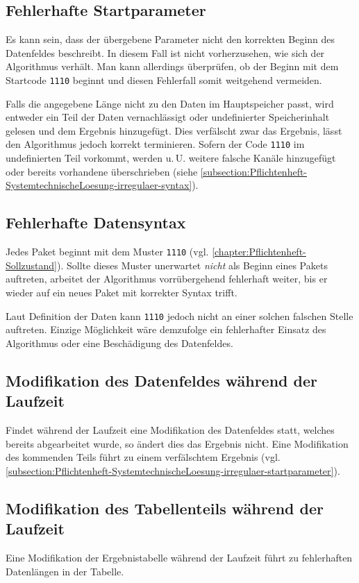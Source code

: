 \subsection{Fehlerhafte Startparameter}
\label{subsection:Pflichtenheft-SystemtechnischeLoesung-irregulaer-startparameter}

Es kann sein, dass der übergebene Parameter nicht den korrekten Beginn des Datenfeldes beschreibt. In diesem Fall ist nicht vorherzusehen, wie sich der Algorithmus verhält. Man kann allerdings überprüfen, ob der Beginn mit dem Startcode \texttt{1110} beginnt und diesen Fehlerfall somit weitgehend vermeiden.

Falls die angegebene Länge nicht zu den Daten im Hauptspeicher passt, wird entweder ein Teil der Daten vernachlässigt oder undefinierter Speicherinhalt gelesen und dem Ergebnis hinzugefügt. Dies verfälscht zwar das Ergebnis, lässt den Algorithmus jedoch korrekt terminieren. Sofern der Code \texttt{1110} im undefinierten Teil vorkommt, werden u.\,U. weitere falsche Kanäle hinzugefügt oder bereits vorhandene überschrieben (siehe \autoref{subsection:Pflichtenheft-SystemtechnischeLoesung-irregulaer-syntax}).

\subsection{Fehlerhafte Datensyntax}
\label{subsection:Pflichtenheft-SystemtechnischeLoesung-irregulaer-syntax}

Jedes Paket beginnt mit dem Muster \texttt{1110} (vgl. \autoref{chapter:Pflichtenheft-Sollzustand}). Sollte dieses Muster unerwartet \emph{nicht} als Beginn eines Pakets auftreten, arbeitet der Algorithmus vorrübergehend fehlerhaft weiter, bis er wieder auf ein neues Paket mit korrekter Syntax trifft.

Laut Definition der Daten kann \texttt{1110} jedoch nicht an einer solchen falschen Stelle auftreten. Einzige Möglichkeit wäre demzufolge ein fehlerhafter Einsatz des Algorithmus oder eine Beschädigung des Datenfeldes.

\subsection{Modifikation des Datenfeldes während der Laufzeit}
\label{subsection:Pflichtenheft-SystemtechnischeLoesung-irregulaer-moddatenfeld}

Findet während der Laufzeit eine Modifikation des Datenfeldes statt, welches bereits abgearbeitet wurde, so ändert dies das Ergebnis nicht. Eine Modifikation des kommenden Teils führt zu einem verfälschtem Ergebnis (vgl. \autoref{subsection:Pflichtenheft-SystemtechnischeLoesung-irregulaer-startparameter}).

\subsection{Modifikation des Tabellenteils während der Laufzeit}
\label{subsection:Pflichtenheft-SystemtechnischeLoesung-irregulaer-modtabelle}

Eine Modifikation der Ergebnistabelle während der Laufzeit führt zu fehlerhaften Datenlängen in der Tabelle.
